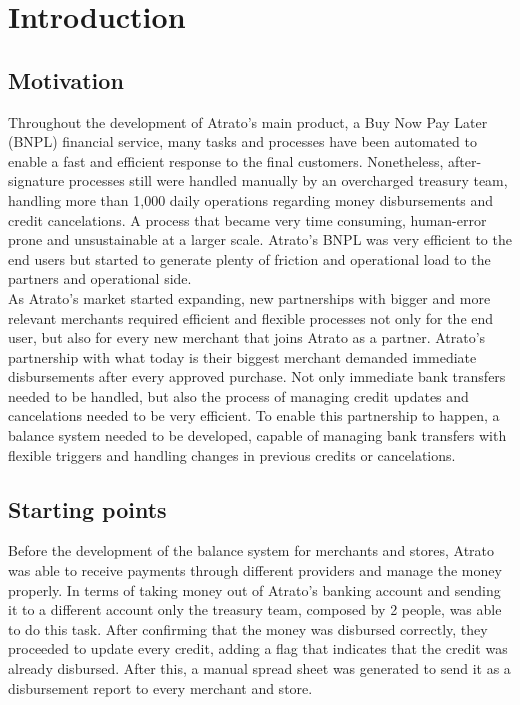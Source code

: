 \chapter{Introduction}


\section{Motivation}

Throughout the development of Atrato’s main product, a Buy Now Pay Later (BNPL) financial service, many tasks and processes have been automated to enable a fast and efficient response to the final customers. Nonetheless, after-signature processes still were handled manually by an overcharged treasury team, handling more than 1,000 daily operations regarding money disbursements and credit cancelations. A process that became very time consuming, human-error prone and unsustainable at a larger scale. Atrato’s BNPL was very efficient to the end users but started to generate plenty of friction and operational load to the partners and operational side.\\

As Atrato’s market started expanding, new partnerships with bigger and more relevant merchants required efficient and flexible processes not only for the end user, but also for every new merchant that joins Atrato as a partner. Atrato’s partnership with what today is their biggest merchant demanded immediate disbursements after every approved purchase. Not only immediate bank transfers needed to be handled, but also the process of managing credit updates and cancelations needed to be very efficient. To enable this partnership to happen, a balance system needed to be developed, capable of managing bank transfers with flexible triggers and handling changes in previous credits or cancelations.


\section{Starting points}

Before the development of the balance system for merchants and stores, Atrato was able to receive payments through different providers and manage the money properly.  In terms of taking money out of Atrato’s banking account and sending it to a different account only the treasury team, composed by 2 people, was able to do this task. After confirming that the money was disbursed correctly, they proceeded to update every credit, adding a flag that indicates that the credit was already disbursed. After this, a manual spread sheet was generated to send it as a disbursement report to every merchant and store.\\


